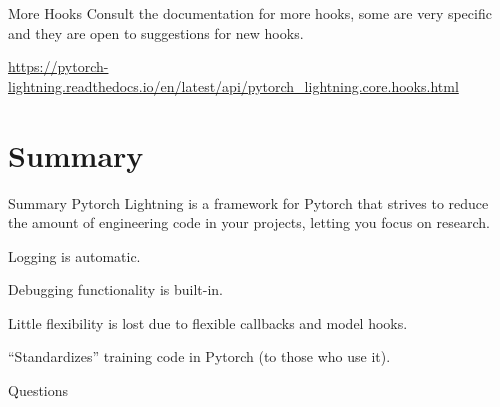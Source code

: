 \documentclass[aspectratio=169]{beamer}
\begin{document}
	\begin{frame}{More Hooks}
		Consult the documentation for more hooks, some are very specific and they are open to suggestions for new hooks. 
		
		\url{https://pytorch-lightning.readthedocs.io/en/latest/api/pytorch_lightning.core.hooks.html}
		
	\end{frame}

	\section{Summary}

	\begin{frame}{Summary}
		Pytorch Lightning is a framework for Pytorch that strives to reduce the amount of engineering code in your projects, letting you focus on research.

		Logging is automatic.

		Debugging functionality is built-in.

		Little flexibility is lost due to flexible callbacks and model hooks.

		``Standardizes'' training code in Pytorch (to those who use it).
	\end{frame}

	\begin{frame}[standout]
		Questions
	\end{frame}
\end{document}
